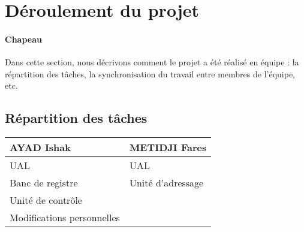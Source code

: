 \section{Déroulement du projet}
\label{sec:deroulement}

\paragraph{Chapeau} Dans cette section, nous décrivons comment le projet a été réalisé en équipe : la répartition des tâches, la synchronisation du travail entre membres de l'équipe, etc.

\subsection{Répartition des tâches}

\begin{center}
\begin{tabular} {|p{3cm}|p{3cm}|}
\hline
AYAD Ishak & METIDJI Fares\\
\hline
UAL & UAL\\
\hline
Banc de registre & Unité d'adressage\\
\hline
Unité de contrôle & \\
\hline
 Modifications personnelles & \\
\hline

\end{tabular}
\end{center}

\begin{center}
\def\angle{0}
\def\radius{3}
\def\cyclelist{{"orange","blue","red","green"}}
\newcount\cyclecount {}
\newcount\ind {}
\end{center}

